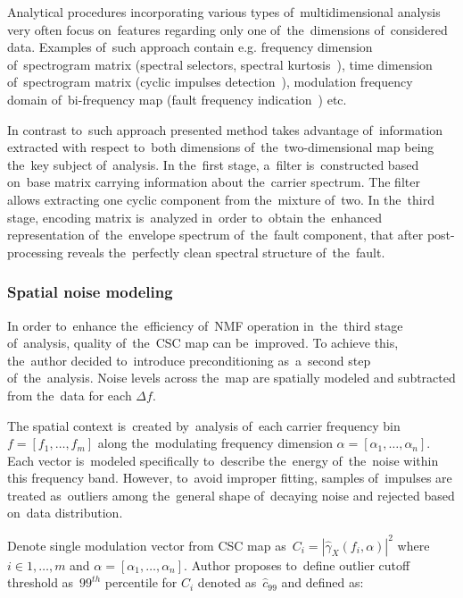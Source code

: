 Analytical procedures incorporating various types of~multidimensional analysis very often focus on~features regarding only one of~the~dimensions of~considered data. Examples of~such approach contain e.g. frequency dimension of~spectrogram matrix (spectral selectors, spectral kurtosis~\cite{antoni2006spectral}), time dimension of~spectrogram matrix (cyclic impulses detection~\cite{kruczek2017cyclic}), modulation frequency domain of~bi-frequency map (fault frequency indication~\cite{kruczek2017multiple}) etc. 

In contrast to~such approach presented method takes advantage of~information extracted with respect to~both dimensions of~the~two-dimensional map being the~key subject of~analysis. In the~first stage, a~filter is~constructed based on~base matrix carrying information about the~carrier spectrum. The filter allows extracting one cyclic component from the~mixture of~two. In the~third stage, encoding matrix is~analyzed in~order to~obtain the~enhanced representation of~the~envelope spectrum of~the~fault component, that after post-processing reveals the~perfectly clean spectral structure of~the~fault.

\subsubsection{Spatial noise modeling}\label{denoise}

In order to~enhance the~efficiency of~NMF operation in~the~third stage of~analysis, quality of~the~CSC map can be~improved. To achieve this, the~author decided to~introduce preconditioning as~a~second step of~the~analysis. Noise levels across the~map are spatially modeled and subtracted from the~data for each $\Delta f$. 

The spatial context is~created by~analysis of~each carrier frequency bin $f = \left[f_1, \dots ,f_m \right]$ along the~modulating frequency dimension $\alpha = \left[\alpha_1, \dots ,\alpha_n \right]$. Each vector is~modeled specifically to~describe the~energy of~the~noise within this frequency band. However, to~avoid improper fitting, samples of~impulses are treated as~outliers among the~general shape of~decaying noise and rejected based on~data distribution. 

Denote single modulation vector from CSC map as~$C_i=\left|\hat{\gamma}_X(f_i,\alpha)\right|^{2}$ where $i \in 1, \dots, m$ and $\alpha = \left[\alpha_1, \dots ,\alpha_n \right]$. Author proposes to~define outlier cutoff threshold as~$99^{th}$ percentile for $C_i$ denoted as~$\hat{c}_{99}$ and defined as:

